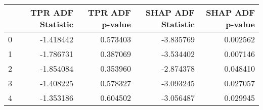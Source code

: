 \begin{tabular}{lrrrr}
\toprule
 & TPR ADF Statistic & TPR ADF p-value & SHAP ADF Statistic & SHAP ADF p-value \\
\midrule
0 & -1.418442 & 0.573403 & -3.835769 & 0.002562 \\
1 & -1.786731 & 0.387069 & -3.534402 & 0.007146 \\
2 & -1.854084 & 0.353960 & -2.874378 & 0.048410 \\
3 & -1.408225 & 0.578327 & -3.093245 & 0.027057 \\
4 & -1.353186 & 0.604502 & -3.056487 & 0.029945 \\
\bottomrule
\end{tabular}
